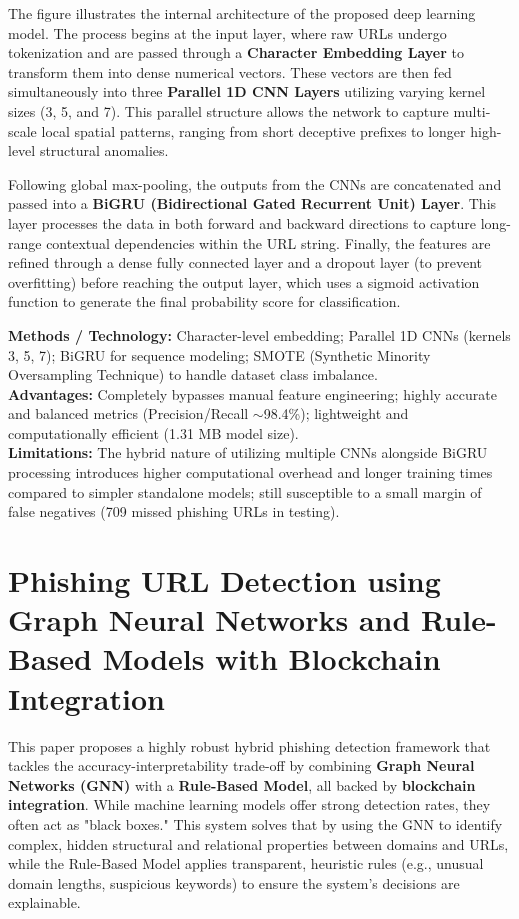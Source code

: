 The figure illustrates the internal architecture of the proposed deep learning model. The process begins at the input layer, where raw URLs undergo tokenization and are passed through a \textbf{Character Embedding Layer} to transform them into dense numerical vectors. These vectors are then fed simultaneously into three \textbf{Parallel 1D CNN Layers} utilizing varying kernel sizes (3, 5, and 7). This parallel structure allows the network to capture multi-scale local spatial patterns, ranging from short deceptive prefixes to longer high-level structural anomalies.

Following global max-pooling, the outputs from the CNNs are concatenated and passed into a \textbf{BiGRU (Bidirectional Gated Recurrent Unit) Layer}. This layer processes the data in both forward and backward directions to capture long-range contextual dependencies within the URL string. Finally, the features are refined through a dense fully connected layer and a dropout layer (to prevent overfitting) before reaching the output layer, which uses a sigmoid activation function to generate the final probability score for classification.

\vspace{.5cm}

\textbf{Methods / Technology:} Character-level embedding; Parallel 1D CNNs (kernels 3, 5, 7); BiGRU for sequence modeling; SMOTE (Synthetic Minority Oversampling Technique) to handle dataset class imbalance.\\
\textbf{Advantages:} Completely bypasses manual feature engineering; highly accurate and balanced metrics (Precision/Recall $\sim$98.4\%); lightweight and computationally efficient (1.31 MB model size).\\
\textbf{Limitations:} The hybrid nature of utilizing multiple CNNs alongside BiGRU processing introduces higher computational overhead and longer training times compared to simpler standalone models; still susceptible to a small margin of false negatives (709 missed phishing URLs in testing).\\


\bigskip

\section{Phishing URL Detection using Graph Neural Networks and Rule-Based Models with Blockchain Integration \cite{p3}}

This paper proposes a highly robust hybrid phishing detection framework that tackles the accuracy-interpretability trade-off by combining \textbf{Graph Neural Networks (GNN)} with a \textbf{Rule-Based Model}, all backed by \textbf{blockchain integration}. While machine learning models offer strong detection rates, they often act as "black boxes." This system solves that by using the GNN to identify complex, hidden structural and relational properties between domains and URLs, while the Rule-Based Model applies transparent, heuristic rules (e.g., unusual domain lengths, suspicious keywords) to ensure the system's decisions are explainable.

